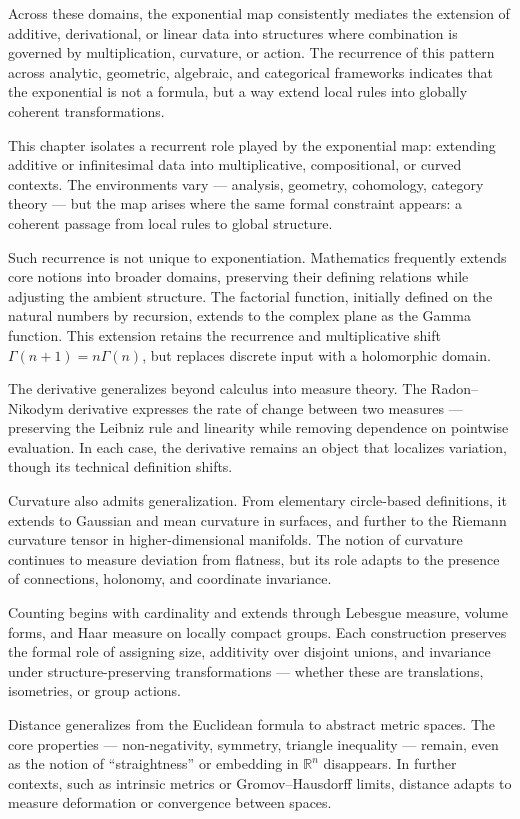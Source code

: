 Across these domains, the exponential map consistently mediates the extension of additive, derivational, or linear data into structures where combination is governed by multiplication, curvature, or action. The recurrence of this pattern across analytic, geometric, algebraic, and categorical frameworks indicates that the exponential is not a formula, but a way extend local rules into globally coherent transformations.


\begin{commentary}[Generalizations]
This chapter isolates a recurrent role played by the exponential map: extending additive or infinitesimal data into multiplicative, compositional, or curved contexts. The environments vary — analysis, geometry, cohomology, category theory — but the map arises where the same formal constraint appears: a coherent passage from local rules to global structure.

Such recurrence is not unique to exponentiation. Mathematics frequently extends core notions into broader domains, preserving their defining relations while adjusting the ambient structure. The factorial function, initially defined on the natural numbers by recursion, extends to the complex plane as the Gamma function. This extension retains the recurrence and multiplicative shift \( \Gamma(n+1) = n\Gamma(n) \), but replaces discrete input with a holomorphic domain.

The derivative generalizes beyond calculus into measure theory. The Radon–Nikodym derivative expresses the rate of change between two measures — preserving the Leibniz rule and linearity while removing dependence on pointwise evaluation. In each case, the derivative remains an object that localizes variation, though its technical definition shifts.

Curvature also admits generalization. From elementary circle-based definitions, it extends to Gaussian and mean curvature in surfaces, and further to the Riemann curvature tensor in higher-dimensional manifolds. The notion of curvature continues to measure deviation from flatness, but its role adapts to the presence of connections, holonomy, and coordinate invariance.

Counting begins with cardinality and extends through Lebesgue measure, volume forms, and Haar measure on locally compact groups. Each construction preserves the formal role of assigning size, additivity over disjoint unions, and invariance under structure-preserving transformations — whether these are translations, isometries, or group actions.

Distance generalizes from the Euclidean formula to abstract metric spaces. The core properties — non-negativity, symmetry, triangle inequality — remain, even as the notion of “straightness” or embedding in $\mathbb{R}^n$ disappears. In further contexts, such as intrinsic metrics or Gromov–Hausdorff limits, distance adapts to measure deformation or convergence between spaces.

\end{commentary}
